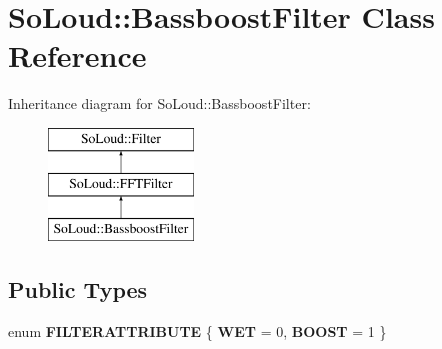 \hypertarget{class_so_loud_1_1_bassboost_filter}{}\section{So\+Loud\+::Bassboost\+Filter Class Reference}
\label{class_so_loud_1_1_bassboost_filter}
Inheritance diagram for So\+Loud\+::Bassboost\+Filter\+:\begin{figure}[H]
\begin{center}
\leavevmode
\includegraphics[height=3.000000cm]{class_so_loud_1_1_bassboost_filter}
\end{center}
\end{figure}
\subsection*{Public Types}
\begin{DoxyCompactItemize}
\item 
\mbox{\label{class_so_loud_1_1_bassboost_filter_a7b75a38ff566a9e470f7404aec931547}} 
enum {\bfseries F\+I\+L\+T\+E\+R\+A\+T\+T\+R\+I\+B\+U\+TE} \{ {\bfseries W\+ET} = 0, 
{\bfseries B\+O\+O\+ST} = 1
 \}
\end{DoxyCompactItemize}
